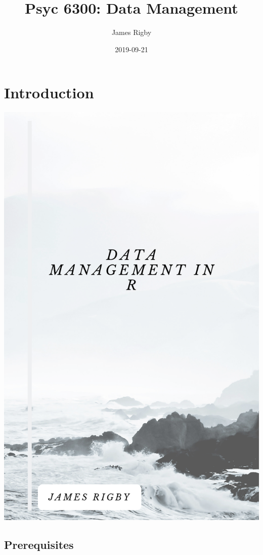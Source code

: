 \documentclass[]{book}
\title{Psyc 6300: Data Management}
\author{James Rigby}
\date{2019-09-21}
\theoremstyle{definition}
\theoremstyle{definition}
\theoremstyle{definition}
\theoremstyle{remark}
\begin{document}
\maketitle

{
\setcounter{tocdepth}{1}
\tableofcontents
}
\hypertarget{introduction}{%
\chapter{Introduction}\label{introduction}}

\includegraphics[width=19.58in]{suppl/cover}

\hypertarget{prerequisites}{%
\section{Prerequisites}\label{prerequisites}}
\end{document}
